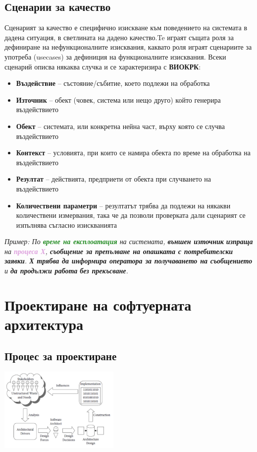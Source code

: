 \documentclass[fleqn,12pt]{article}
\begin{document}
\subsection {Сценарии за качество}
Сценарият за качество е специфично изискване към поведението на системата в дадена ситуация, в светлината на дадено качество.Te играят същата роля за дефиниране на нефункционалните изисквания, каквато роля играят сценариите за употреба (usecases) за дефиниция на функционалните изисквания.  Всеки сценарий описва някаква случка и се характеризира с \textbf{ВИОКРК}:
\begin {itemize}
\item \textbf{Въздействие} – състояние/събитие, което подлежи на обработка 
\item \textbf{Източник} – обект (човек, система или нещо друго) който генерира въздействието
\item \textbf{Обект} – системата, или конкретна нейна част, върху която се случва въздействието
\item \textbf{Контекст} – условията, при които се намира обекта по време на обработка на въздействието
\item \textbf{Резултат} – действията, предприети от обекта при случването на въздействието
\item \textbf{Количествени параметри} – резултатът трябва да подлежи на някакви количествени измервания, така че да позволи проверката дали сценарият се изпълнява съгласно изискванията
\end{itemize}

\textit{Пример: 
По \textbf{\textcolor{ForestGreen}{време на експлоатация}} на системата,
\textbf{\textcolor{RubineRed}{външен източник}} \textbf{\textcolor{BurntOrange}{изпраща}} на \textbf{\textcolor{Plum}{процеса Х}}, \textbf{\textcolor{BurntOrange}{съобщение за препълване на опашката с потребителски заявки}}.
\textbf{\textcolor{TealBlue}{Х трябва да информира оператора за получаването на съобщението}} и 
\textbf{\textcolor{TealBlue}{да продължи работа}} \textbf{\textcolor{Sepia}{без прекъсване}}.}


\section{Проектиране на софтуерната архитектура}
\subsection{Процес за проектиране}

\begin{center} \includegraphics[width=220px]{sa_creation_process.png} \end{center}
\end{document}
